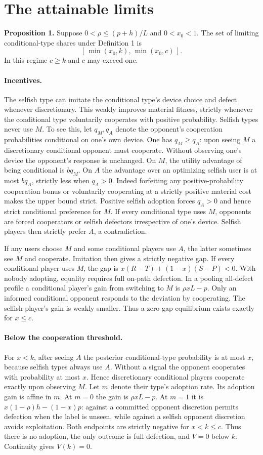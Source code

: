 \documentclass[11pt]{article}
\begin{document}
\section{The attainable limits}
\textbf{Proposition 1.} Suppose $0<\rho\le(p+h)/L$ and $0<x_0<1$. The set of limiting conditional-type shares under Definition 1 is
\[
  [\,\min(x_0,k),\,\min(x_0,c)\,].
\]
In this regime $c\ge k$ and $c$ may exceed one.

\paragraph{Incentives.} The selfish type can imitate the conditional type's device choice and defect whenever discretionary. This weakly improves material fitness, strictly whenever the conditional type voluntarily cooperates with positive probability. Selfish types never use $M$. To see this, let $q_M,q_A$ denote the opponent's cooperation probabilities conditional on one's own device. One has $q_M\ge q_A$: upon seeing $M$ a discretionary conditional opponent must cooperate. Without observing one's device the opponent's response is unchanged. On $M$, the utility advantage of being conditional is $bq_M$. On $A$ the advantage over an optimizing selfish user is at most $bq_A$, strictly less when $q_A>0$. Indeed forfeiting any positive-probability cooperation bonus or voluntarily cooperating at a strictly positive material cost makes the upper bound strict. Positive selfish adoption forces $q_A>0$ and hence strict conditional preference for $M$. If every conditional type uses $M$, opponents are forced cooperators or selfish defectors irrespective of one's device. Selfish players then strictly prefer $A$, a contradiction.

If any users choose $M$ and some conditional players use $A$, the latter sometimes see $M$ and cooperate. Imitation then gives a strictly negative gap. If every conditional player uses $M$, the gap is $x(R-T)+(1-x)(S-P)<0$. With nobody adopting, equality requires full on-path defection. In a pooling all-defect profile a conditional player's gain from switching to $M$ is $\rho xL-p$. Only an informed conditional opponent responds to the deviation by cooperating. The selfish player's gain is weakly smaller. Thus a zero-gap equilibrium exists exactly for $x\le c$.

\paragraph{Below the cooperation threshold.} For $x<k$, after seeing $A$ the posterior conditional-type probability is at most $x$, because selfish types always use $A$. Without a signal the opponent cooperates with probability at most $x$. Hence discretionary conditional players cooperate exactly upon observing $M$. Let $m$ denote their type's adoption rate. Its adoption gain is affine in $m$. At $m=0$ the gain is $\rho xL-p$. At $m=1$ it is $x(1-\rho)h-(1-x)p$: against a committed opponent discretion permits defection when the label is unseen, while against a selfish opponent discretion avoids exploitation. Both endpoints are strictly negative for $x<k\le c$. Thus there is no adoption, the only outcome is full defection, and $V=0$ below $k$. Continuity gives $V(k)=0$.
\end{document}

